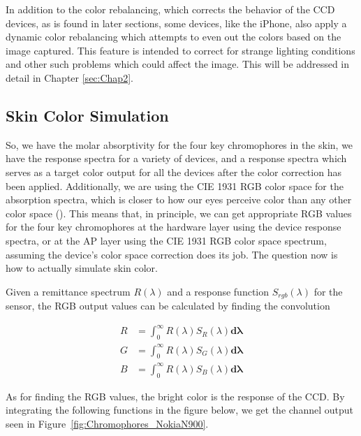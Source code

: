 In addition to the color rebalancing, which corrects the behavior of the CCD devices, as is found in later sections, some devices, like the iPhone, also apply a dynamic color rebalancing which attempts to even out the colors based on the image captured. This feature is intended to correct for strange lighting conditions and other such problems which could affect the image. This will be addressed in detail in Chapter \ref{sec:Chap2}.

\clearpage

\subsection{Skin Color Simulation} \label{sec:SkinColorSimulation}

So, we have the molar absorptivity for the four key chromophores in the skin, we have the response spectra for a variety of devices, and a response spectra which serves as a target color output for all the devices after the color correction has been applied. Additionally, we are using the CIE 1931 RGB color space for the absorption spectra, which is closer to how our eyes perceive color than any other color space (\cite{RIDI2013}). This means that, in principle, we can get appropriate RGB values for the four key chromophores at the hardware layer using the device response spectra, or at the AP layer using the CIE 1931 RGB color space spectrum, assuming the device's color space correction does its job. The question now is how to actually simulate skin color.

Given a remittance spectrum $R(\lambda)$ and a response function $S_{rgb}(\lambda)$ for the sensor, the RGB output values can be calculated by finding the convolution 

\begin{align}
R & = \int_{0}^{\infty} R(\lambda) S_{R} (\lambda)  \mathbf{d\lambda}\\
G & = \int_{0}^{\infty} R(\lambda) S_{G} (\lambda) \mathbf{d\lambda}\\
B & = \int_{0}^{\infty} R(\lambda) S_{B} (\lambda)  \mathbf{d\lambda}
\end{align}

As for finding the RGB values, the bright color is the response of the CCD. By integrating the following functions in the figure below, we get the channel output seen in Figure~\ref{fig:Chromophores_NokiaN900}.


